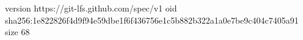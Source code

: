 version https://git-lfs.github.com/spec/v1
oid sha256:1e822826f4d9f94e59dbe1f6f436756e1c5b882b322a1a0e7be9c404c7405a91
size 68
